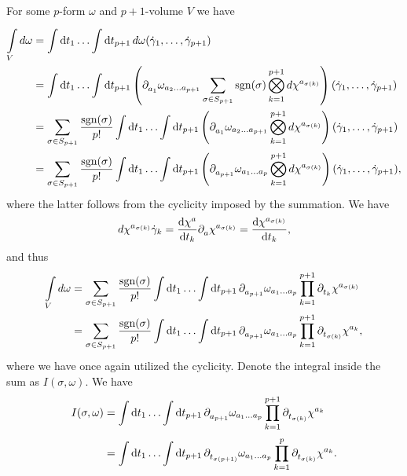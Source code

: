 For some $p$-form $\omega$ and $p + 1$-volume $V$ we have
\begin{align*}
	\inte{V}{}\df{\omega} &= \inte{}{}\dd{t_{1}}{\dots \inte{}{}\dd{t_{p + 1}}{d\omega(\dot{\gamma}_{1},\dots, \dot{\gamma}_{p + 1})}} \\
	                      &= \inte{}{}\dd{t_{1}}{\dots \inte{}{}\dd{t_{p + 1}}{\left(\del{}{a_{1}}{\omega_{a_{2}\dots a_{p + 1}}}\sum\limits_{\sigma\in S_{p + 1}}\text{sgn}(\sigma)\bigotimes_{k = 1}^{p + 1}d\chi^{a_{\sigma(k)}}\right)(\dot{\gamma}_{1},\dots, \dot{\gamma}_{p + 1})}} \\
	                      &= \sum\limits_{\sigma\in S_{p + 1}}\frac{\text{sgn}(\sigma)}{p!}\inte{}{}\dd{t_{1}}{\dots \inte{}{}\dd{t_{p + 1}}{\left(\del{}{a_{1}}{\omega_{a_{2}\dots a_{p + 1}}}\bigotimes_{k = 1}^{p + 1}d\chi^{a_{\sigma(k)}}\right)(\dot{\gamma}_{1},\dots, \dot{\gamma}_{p + 1})}} \\
	                      &= \sum\limits_{\sigma\in S_{p + 1}}\frac{\text{sgn}(\sigma)}{p!}\inte{}{}\dd{t_{1}}{\dots \inte{}{}\dd{t_{p + 1}}{\left(\del{}{a_{p + 1}}{\omega_{a_{1}\dots a_{p}}}\bigotimes_{k = 1}^{p + 1}d\chi^{a_{\sigma(k)}}\right)(\dot{\gamma}_{1},\dots, \dot{\gamma}_{p + 1})}},
\end{align*}
where the latter follows from the cyclicity imposed by the summation. We have
\begin{align*}
d\chi^{a_{\sigma(k)}}{\dot{\gamma}_{k}} = \dv{\chi^{a}}{t_{k}}\partial^{}_{a}{\chi^{a_{\sigma(k)}}} = \dv{\chi^{a_{\sigma(k)}}}{t_{k}},
\end{align*}
and thus
\begin{align*}
	\inte{V}{}\df{\omega} &= \sum\limits_{\sigma\in S_{p + 1}}\frac{\text{sgn}(\sigma)}{p!}\inte{}{}\dd{t_{1}}{\dots \inte{}{}\dd{t_{p + 1}}{\del{}{a_{p + 1}}{\omega_{a_{1}\dots a_{p}}}\prod\limits_{k = 1}^{p + 1}\del{}{t_{k}}{\chi^{a_{\sigma(k)}}}}} \\
	                      &= \sum\limits_{\sigma\in S_{p + 1}}\frac{\text{sgn}(\sigma)}{p!}\inte{}{}\dd{t_{1}}{\dots \inte{}{}\dd{t_{p + 1}}{\del{}{a_{p + 1}}{\omega_{a_{1}\dots a_{p}}}\prod\limits_{k = 1}^{p + 1}\del{}{t_{\sigma(k)}}{\chi^{a_{k}}}}},
\end{align*}
where we have once again utilized the cyclicity. Denote the integral inside the sum as $I(\sigma, \omega)$. We have
\begin{align*}
	I(\sigma, \omega) &= \inte{}{}\dd{t_{1}}{\dots \inte{}{}\dd{t_{p + 1}}{\del{}{a_{p + 1}}{\omega_{a_{1}\dots a_{p}}}\prod\limits_{k = 1}^{p + 1}\del{}{t_{\sigma(k)}}{\chi^{a_{k}}}}} \\
	                  &= \inte{}{}\dd{t_{1}}{\dots \inte{}{}\dd{t_{p + 1}}{\del{}{t_{\sigma(p + 1)}}{\omega_{a_{1}\dots a_{p}}}\prod\limits_{k = 1}^{p}\del{}{t_{\sigma(k)}}{\chi^{a_{k}}}}}.
\end{align*}

